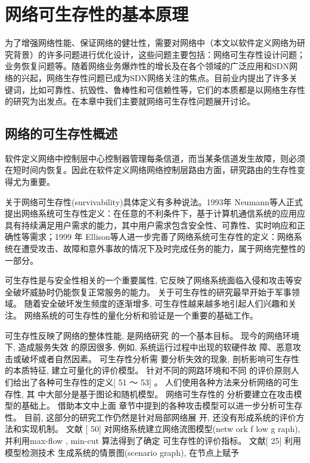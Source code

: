 
\chapter{网络可生存性的基本原理}
为了增强网络性能、保证网络的健壮性，需要对网络中（本文以软件定义网络为研究背景）的许多问题进行优化设计，这些问题主要包括：网络可生存性设计问题；业务恢复问题等。随着网络业务爆炸性的增长及在各个领域的广泛应用和SDN网络的兴起，网络生存性问题已成为SDN网络关注的焦点。目前业内提出了许多关键词，比如可靠性、抗毁性、鲁棒性和可信赖性等，它们的本质都是以网络生存性的研究为出发点。在本章中我们主要就网络可生存性问题展开讨论。



\section{网络的可生存性概述}
软件定义网络中控制层中心控制器管理每条信道，而当某条信道发生故障，则必须在短时间内恢复。因此在软件定义网络网络控制层路由方面，研究路由的生存性变得尤为重要。

关于网络可生存性(survivability)具体定义有多种说法\cite{al2009comparative}。1993年 Neumann\cite{hollway1993survivable}等人正式提出网络系统可生存性定义：在任意的不利条件下，基于计算机通信系统的应用应具有持续满足用户需求的能力，其中用户需求包含安全性、可靠性、实时响应和正确性等需求；1999 年 Ellison\cite{ellison1997survivable}等人进一步完善了网络系统可生存性的定义：网络系统在遭受攻击、故障和意外事故的情况下及时完成任务的能力，属于网络完整性的一部分。


可生存性是与安全性相关的一个重要属性, 它反映了网络系统面临入侵和攻击等安全破坏威胁时仍能恢复正常服务的能力\cite{jha2000survivability}。 关于可生存性的研究最早开始于军事领域\cite{frank1974survivability}。 随着安全破坏发生频度的逐渐增多, 可生存性越来越多地引起人们兴趣和关注。 网络系统的可生存性的量化分析和验证是一个重要的基础工作。


可生存性反映了网络的整体性能, 是网络研究
的一个基本目标。 现今的网络环境下, 造成服务失效
的原因很多, 例如, 系统运行过程中出现的软硬件故
障、恶意攻击或破坏或者自然因素。 可生存性分析需
要分析失效的现象, 剖析影响可生存性的本质特征,
建立可量化的评价模型。 针对不同的网路环境和不同
的评价原则人们给出了各种可生存性的定义[ 51 ～ 53] 。
人们使用各种方法来分析网络的可生存性, 其
中大部分是基于图论和随机模型。 网络可生存性的
分析要建立在攻击模型的基础上。 借助本文中上面
章节中提到的各种攻击模型可以进一步分析可生存
性。 目前, 这部分的研究工作仍然是针对局部网络展
开, 还没有形成系统的评价方法和实现机制。 文献
[ 50] 对网络系统建立网络流图模型(netw ork f low
g raph), 并利用max-flow , min-cut 算法得到了确定
可生存性的评价指标。 文献[ 25] 利用模型检测技术
生成系统的情景图(scenario graph), 在节点上赋予


